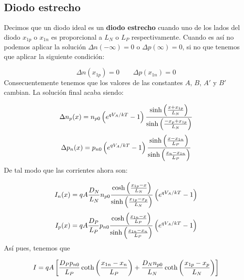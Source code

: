 \subsection{Diodo estrecho}

Decimos que un diodo ideal es un \textbf{diodo estrecho} cuando uno de los lados del diodo $x_{1p}$ o $x_{1n}$ es proporcional a $L_N$ o $L_P$  respectivamente. Cuando es así no podemos aplicar la solución $\Delta n (-\infty) = 0$ o $\Delta p (\infty) = 0$, si no que tenemos que aplicar la siguiente condición:

\begin{equation}
    \Delta n  (x_{1p}) = 0 \qquad \Delta p (x_{1n}) = 0
\end{equation}
Consecuentemente tenemos que los valores de las constantes $A$, $B$, $A'$ y $B'$ cambian. La solución final acaba siendo:

\begin{equation}
    \Delta n_p (x) = n_{p0} \left( e^{qV_A/kT}-1 \right) \frac{\sinh \left( \frac{x+x_{1p}}{L_N} \right)}{\sinh \left( \frac{-x_{p}+x_{1p}}{L_N} \right)}
\end{equation}
\begin{equation}
    \Delta p_n (x) = p_{n0} \left( e^{qV_A/kT}-1 \right) \frac{\sinh \left( \frac{x-x_{1n}}{L_P} \right)}{\sinh \left( \frac{x_{n}-x_{1n}}{L_P} \right)}
\end{equation}
De tal modo que las corrientes ahora son:

\begin{equation}
    I_n (x) = qA \frac{D_N}{L_N} n_{p0} \frac{\cosh \left( \frac{x_{1p}-x}{L_N} \right)}{\sinh \left( \frac{x_{1p}-x_p}{L_N} \right)} \left( e^{qV_A/kT}-1 \right)
\end{equation}
\begin{equation}
    I_p (x) = qA \frac{D_P}{L_P} p_{n0}  \frac{\cosh\left( \frac{x_{1n}-x}{L_P} \right)}{\sinh \left( \frac{x_{1n}-x_n}{L_P} \right)}  \left( e^{qV_A/kT}-1 \right)
\end{equation}
Así pues, tenemos que 

\begin{equation}
    I = qA\left[ \frac{D_Pp_{n0}}{L_P} \coth \left( \frac{x_{1n}-x_n}{L_P} \right)+\frac{D_N n_{p0}}{L_N} \coth \left( \frac{x_{1p}-x_p}{L_N} \right) \right]
\end{equation}




